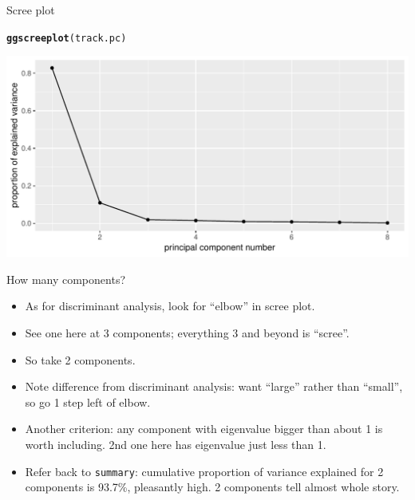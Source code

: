 \documentclass[unknownkeysallowed]{beamer}\usepackage[]{graphicx}\usepackage[]{color}
\makeatletter
\def\maxwidth{ %
  \ifdim\Gin@nat@width>\linewidth
    \linewidth
  \else
    \Gin@nat@width
  \fi
}
\newcommand{\hlstd}[1]{\textcolor[rgb]{0.345,0.345,0.345}{#1}}%
\newcommand{\hlkwd}[1]{\textcolor[rgb]{0.737,0.353,0.396}{\textbf{#1}}}%
\newenvironment{kframe}{%
 \def\at@end@of@kframe{}%
 \ifinner\ifhmode%
  \def\at@end@of@kframe{\end{minipage}}%
  \begin{minipage}{\columnwidth}%
 \fi\fi%
 \def\FrameCommand##1{\hskip\@totalleftmargin \hskip-\fboxsep
 \colorbox{shadecolor}{##1}\hskip-\fboxsep
     \hskip-\linewidth \hskip-\@totalleftmargin \hskip\columnwidth}%
 \MakeFramed {\advance\hsize-\width
   \@totalleftmargin\z@ \linewidth\hsize
   \@setminipage}}%
 {\par\unskip\endMakeFramed%
 \at@end@of@kframe}
\newenvironment{knitrout}{}{} %
\makeatother
\begin{document}
\begin{frame}[fragile]{Scree plot}

\begin{knitrout}
\color{fgcolor}\begin{kframe}
\begin{alltt}
\hlkwd{ggscreeplot}\hlstd{(track.pc)}
\end{alltt}
\end{kframe}
\includegraphics[width=\maxwidth]{figure/scree-b-1} 

\end{knitrout}

\end{frame}


\begin{frame}[fragile]{How many components?}
  
  \begin{itemize}
  \item As for discriminant analysis, look for ``elbow'' in scree plot.
  \item See one here at 3 components; everything 3 and beyond is ``scree''.
  \item So take 2 components.
  \item Note difference from discriminant analysis: want ``large''
    rather than ``small'', so go 1 step left of elbow.
  \item Another criterion: any component with eigenvalue bigger than
    about 1 is worth including. 2nd one here has eigenvalue just less
    than 1.
  \item Refer back to \texttt{summary}: cumulative proportion of
    variance explained for 2 components is 93.7\%, pleasantly high. 2
    components tell almost whole story.
  \end{itemize}
  
\end{frame}
\end{document}
